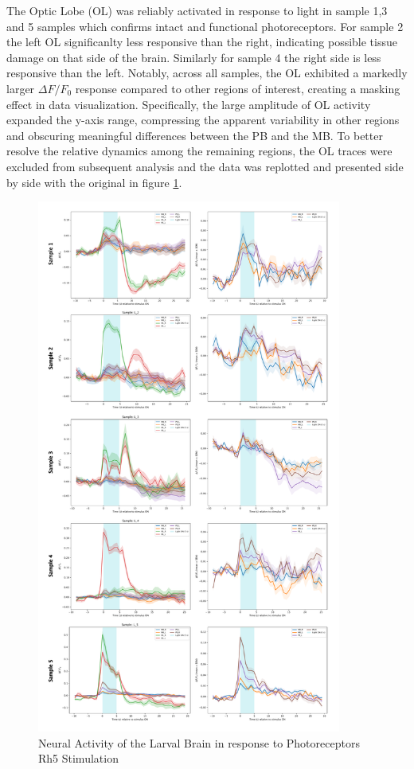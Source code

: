 The Optic Lobe (OL) was reliably activated in response to light in sample 1,3 and 5 samples which confirms intact and functional photoreceptors. For sample 2 the left OL significanlty less responsive than the right, indicating possible tissue damage on that side of the brain. Similarly for sample 4 the right side is less responsive than the left. 
Notably, across all samples, the OL exhibited a markedly larger $\Delta F/F_0$ response compared to other regions of interest, creating a masking effect in data visualization. Specifically, the large amplitude of OL activity expanded the y-axis range, compressing the apparent variability in other regions and obscuring meaningful differences between the PB and the MB. To better resolve the relative dynamics among the remaining regions, the OL traces were excluded from subsequent analysis and the data was replotted and presented side by side with the original in figure \ref{LSanalysis}. 

 
    \begin{figure}
        \centering
        \includegraphics[width=10cm]{Figs/CX/LSanalysis.pdf}
        \caption[Neural Activity of the Larval Brain in response to Photoreceptors Rh5 Stimulation]{Neural Activity of the Larval Brain in response to Photoreceptors Rh5 Stimulation}
        \label{LSanalysis}
    \end{figure}


